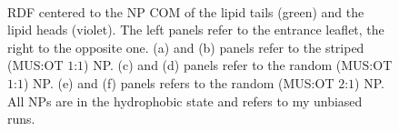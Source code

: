 \begin{figure}[p]
{		}\\%
		\caption{\acs{RDF} centered to the \acs{NP} \acs{COM} of the lipid tails (green) and the lipid heads (violet). The left panels refer to the entrance leaflet, the right to the opposite one. (a) and (b) panels refer to the striped (\acs{MUS}:\acs{OT} $1$:$1$) \acs{NP}. (c) and (d) panels refer to the random (\acs{MUS}:\acs{OT} $1$:$1$) \acs{NP}. (e) and (f) panels refers to the random (\acs{MUS}:\acs{OT} $2$:$1$) \acs{NP}. All \acp{NP} are in the hydrophobic state and refers to my unbiased runs.}%
		\label{fig:RDF}
\end{figure}
